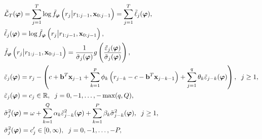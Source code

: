 \documentclass[10pt,a4paper,oneside]{article}
\newcommand{\R}{\mathbb{R}}
\begin{document}
\begin{align*}
     & \tilde{\mathcal{L}}_{T}(\boldsymbol{\varphi}) = \sum^T_{j = 1} \log \tilde{f}_{\boldsymbol{\varphi}}\left(r_{j} \big | r_{1: j - 1}, \mathbf{x}_{0: j - 1} \right) = \sum^T_{j = 1} \tilde{\ell}_j(\boldsymbol{\varphi}),                                                                           \\
     & \tilde{\ell}_j(\boldsymbol{\varphi}) = \log \tilde{f}_{\boldsymbol{\varphi}}\left(r_{j} \big | r_{1: j - 1}, \mathbf{x}_{0 : j - 1} \right),                                                                                                                                                        \\
     & \tilde{f}_{\boldsymbol{\varphi}}\left(r_{j} \big | r_{1: j - 1}, \mathbf{x}_{0 : j - 1} \right) = \frac{1}{\tilde{\sigma}_j(\boldsymbol{\varphi})} g\left( \frac{\tilde{\varepsilon}_j(\boldsymbol{\varphi})}{\tilde{\sigma}_j(\boldsymbol{\varphi})} \right),                                      \\
     & \tilde{\varepsilon}_j(\boldsymbol{\varphi}) = r_j - \left(c +  \mathbf{b}^T \mathbf{x}_{j - 1} + \sum^p_{k = 1} \phi_k \left(r_{j - k} - c - \mathbf{b}^T \mathbf{x}_{j - k - 1}\right) + \sum^q_{j = 1} \theta_k \tilde{\varepsilon}_{j - k}(\boldsymbol{\varphi}) \right), \hspace{2mm} j \geq 1, \\
     & \tilde{\varepsilon}_j(\boldsymbol{\varphi}) = c_j \in \R, \hspace{2mm} j = 0, -1, \dots, - \max(q, Q),                                                                                                                                                                                              \\
     & \tilde{\sigma}^2_j(\boldsymbol{\varphi}) = \omega + \sum^Q_{k = 1} \alpha_k \tilde{\varepsilon}^2_{j - k}(\boldsymbol{\varphi}) + \sum^P_{k = 1} \beta_k \tilde{\sigma}^2_{j - k}(\boldsymbol{\varphi}), \hspace{2mm} j \geq 1,                                                                     \\
     & \tilde{\sigma}^2_j(\boldsymbol{\varphi}) = c'_j \in [0, \infty), \hspace{2mm} j = 0, -1, \dots, -P,
\end{align*}
\end{document}
